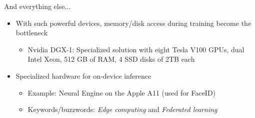 \begin{frame} {And everything else...}
  \begin{itemize}
    \item With such powerful devices, memory/disk access during training become the bottleneck
    \begin{itemize}
      \item Nvidia DGX-1: Specialized solution with eight Tesla V100 GPUs, dual Intel Xeon, 512 GB of RAM, 4 SSD disks of 2TB each
    \end{itemize}
    \item Specialized hardware for on-device inference
    \begin{itemize}
      \item Example: Neural Engine on the Apple A11 (used for FaceID)
      \item Keywords/buzzwords: \emph{Edge computing} and \emph{Federated learning}
    \end{itemize}
  \end{itemize}
\end{frame}

